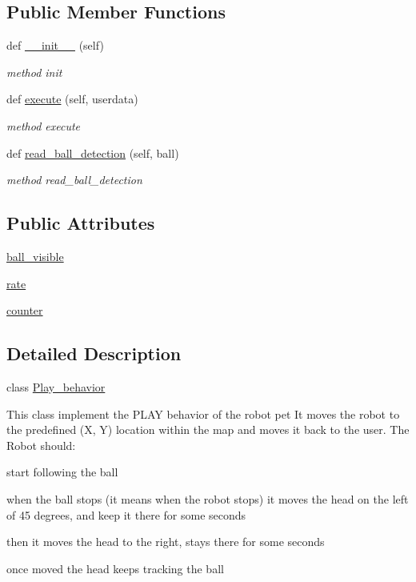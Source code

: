 \subsection*{Public Member Functions}
\begin{DoxyCompactItemize}
\item 
def \hyperlink{classbehavior__manager_1_1Play__behavior_aaa6ce2b1855d0a235e324df41d8519a1}{\+\_\+\+\_\+init\+\_\+\+\_\+} (self)
\begin{DoxyCompactList}\small\item\em method init \end{DoxyCompactList}\item 
def \hyperlink{classbehavior__manager_1_1Play__behavior_a6c5231ed8f406c82e06c741e89b0f666}{execute} (self, userdata)
\begin{DoxyCompactList}\small\item\em method execute \end{DoxyCompactList}\item 
def \hyperlink{classbehavior__manager_1_1Play__behavior_a18ca2b15910c2db68cb3371a6d76c58c}{read\+\_\+ball\+\_\+detection} (self, ball)
\begin{DoxyCompactList}\small\item\em method read\+\_\+ball\+\_\+detection \end{DoxyCompactList}\end{DoxyCompactItemize}
\subsection*{Public Attributes}
\begin{DoxyCompactItemize}
\item 
\hyperlink{classbehavior__manager_1_1Play__behavior_ae48c1c6a1bf708f9c4cc0bc9e2bdd8fe}{ball\+\_\+visible}
\item 
\hyperlink{classbehavior__manager_1_1Play__behavior_af636412228a2da30ad114266cbd121e3}{rate}
\item 
\hyperlink{classbehavior__manager_1_1Play__behavior_a9ef35e23e54823711001f1d3ca3a3c76}{counter}
\end{DoxyCompactItemize}


\subsection{Detailed Description}
class \hyperlink{classbehavior__manager_1_1Play__behavior}{Play\+\_\+behavior} 

This class implement the P\+L\+AY behavior of the robot pet It moves the robot to the predefined (X, Y) location within the map and moves it back to the user. The Robot should\+:
\begin{DoxyItemize}
\item start following the ball
\item when the ball stops (it means when the robot stops) it moves the head on the left of 45 degrees, and keep it there for some seconds
\item then it moves the head to the right, stays there for some seconds
\item once moved the head keeps tracking the ball 
\end{DoxyItemize}

